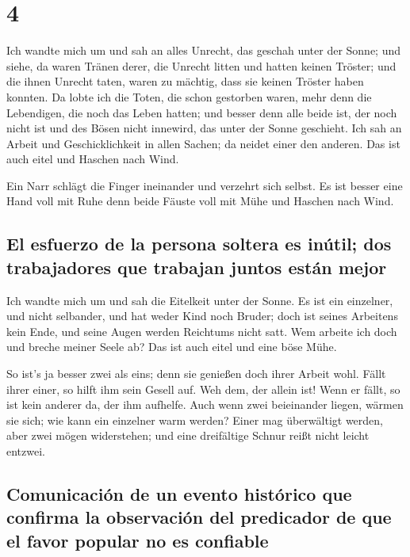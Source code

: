 \hypertarget{section-3}{%
\section{4}\label{section-3}}

 Ich wandte mich um und sah an alles Unrecht, das geschah
unter der Sonne; und siehe, da waren Tränen derer, die Unrecht litten
und hatten keinen Tröster; und die ihnen Unrecht taten, waren zu
mächtig, dass sie keinen Tröster haben konnten.  Da lobte
ich die Toten, die schon gestorben waren, mehr denn die Lebendigen, die
noch das Leben hatten;  und besser denn alle beide ist,
der noch nicht ist und des Bösen nicht innewird, das unter der Sonne
geschieht.  Ich sah an Arbeit und Geschicklichkeit in
allen Sachen; da neidet einer den anderen. Das ist auch eitel und
Haschen nach Wind.

 Ein Narr schlägt die Finger ineinander und verzehrt sich
selbst.  Es ist besser eine Hand voll mit Ruhe denn beide
Fäuste voll mit Mühe und Haschen nach Wind.

\hypertarget{el-esfuerzo-de-la-persona-soltera-es-inuxfatil-dos-trabajadores-que-trabajan-juntos-estuxe1n-mejor}{%
\subsection{El esfuerzo de la persona soltera es inútil; dos
trabajadores que trabajan juntos están
mejor}\label{el-esfuerzo-de-la-persona-soltera-es-inuxfatil-dos-trabajadores-que-trabajan-juntos-estuxe1n-mejor}}

 Ich wandte mich um und sah die Eitelkeit unter der Sonne.
 Es ist ein einzelner, und nicht selbander, und hat weder
Kind noch Bruder; doch ist seines Arbeitens kein Ende, und seine Augen
werden Reichtums nicht satt. Wem arbeite ich doch und breche meiner
Seele ab? Das ist auch eitel und eine böse Mühe.

 So ist's ja besser zwei als eins; denn sie genießen doch
ihrer Arbeit wohl.  Fällt ihrer einer, so hilft ihm sein
Gesell auf. Weh dem, der allein ist! Wenn er fällt, so ist kein anderer
da, der ihm aufhelfe.  Auch wenn zwei beieinander liegen,
wärmen sie sich; wie kann ein einzelner warm werden? 
Einer mag überwältigt werden, aber zwei mögen widerstehen; und eine
dreifältige Schnur reißt nicht leicht entzwei.

\hypertarget{comunicaciuxf3n-de-un-evento-histuxf3rico-que-confirma-la-observaciuxf3n-del-predicador-de-que-el-favor-popular-no-es-confiable}{%
\subsection{Comunicación de un evento histórico que confirma la
observación del predicador de que el favor popular no es
confiable}\label{comunicaciuxf3n-de-un-evento-histuxf3rico-que-confirma-la-observaciuxf3n-del-predicador-de-que-el-favor-popular-no-es-confiable}}


